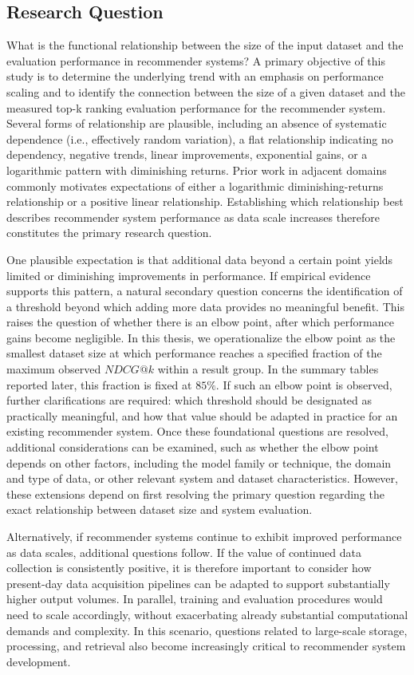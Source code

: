 \documentclass[12pt,a4paper]{article}
\begin{document}
\subsection{Research Question}
What is the functional relationship between the size of the input dataset and the evaluation performance in recommender systems? A primary objective of this study is to determine the underlying trend with an emphasis on performance scaling and to identify the connection between the size of a given dataset and the measured top-k ranking evaluation performance for the recommender system. Several forms of relationship are plausible, including an absence of systematic dependence (i.e., effectively random variation), a flat relationship indicating no dependency, negative trends, linear improvements, exponential gains, or a logarithmic pattern with diminishing returns. Prior work in adjacent domains commonly motivates expectations of either a logarithmic diminishing-returns relationship or a positive linear relationship. Establishing which relationship best describes recommender system performance as data scale increases therefore constitutes the primary research question.

One plausible expectation is that additional data beyond a certain point yields limited or diminishing improvements in performance. If empirical evidence supports this pattern, a natural secondary question concerns the identification of a threshold beyond which adding more data provides no meaningful benefit. This raises the question of whether there is an elbow point, after which performance gains become negligible. In this thesis, we operationalize the elbow point as the smallest dataset size at which performance reaches a specified fraction of the maximum observed $NDCG@k$ within a result group. In the summary tables reported later, this fraction is fixed at $85\%$. If such an elbow point is observed, further clarifications are required: which threshold should be designated as practically meaningful, and how that value should be adapted in practice for an existing recommender system. Once these foundational questions are resolved, additional considerations can be examined, such as whether the elbow point depends on other factors, including the model family or technique, the domain and type of data, or other relevant system and dataset characteristics. However, these extensions depend on first resolving the primary question regarding the exact relationship between dataset size and system evaluation.

Alternatively, if recommender systems continue to exhibit improved performance as data scales, additional questions follow. If the value of continued data collection is consistently positive, it is therefore important to consider how present-day data acquisition pipelines can be adapted to support substantially higher output volumes. In parallel, training and evaluation procedures would need to scale accordingly, without exacerbating already substantial computational demands and complexity. In this scenario, questions related to large-scale storage, processing, and retrieval also become increasingly critical to recommender system development.
\end{document}
